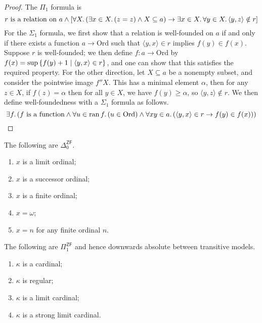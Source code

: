 \begin{proof}
    The \( \Pi_1 \) formula is
    \[ r \text{ is a relation on } a \wedge \qty[\forall X.\,(\exists x \in X.\, (z = z) \wedge X \subseteq a) \to \exists x \in X.\, \forall y \in X.\, \langle y, z \rangle \notin r] \]
    For the \( \Sigma_1 \) formula, we first show that a relation is well-founded on \( a \) if and only if there exists a function \( a \to \mathrm{Ord} \) such that \( \langle y, x \rangle \in r \) implies \( f(y) \in f(x) \).
    Suppose \( r \) is well-founded; we then define \( f : a \to \mathrm{Ord} \) by \( f(x) = \sup\qty{f(y) + 1 \mid \langle y, x \rangle \in r} \), and one can show that this satisfies the required property.
    For the other direction, let \( X \subseteq a \) be a nonempty subset, and consider the pointwise image \( f''X \).
    This has a minimal element \( \alpha \), then for any \( z \in X \), if \( f(z) = \alpha \) then for all \( y \in X \), we have \( f(y) \geq \alpha \), so \( \langle y, z \rangle \notin r \).
    We then define well-foundedness with a \( \Sigma_1 \) formula as follows.
    \[ \exists f.\, \qty(f \text{ is a function} \wedge \forall u \in \operatorname{ran} f.\, (u \in \mathrm{Ord}) \wedge \forall x y \in a.\, (\langle y, x \rangle \in r \to f(y) \in f(x))) \]
\end{proof}
\begin{proposition}
    The following are \( \Delta_0^{\mathsf{ZF}} \).
    \begin{enumerate}
        \item \( x \) is a limit ordinal;
        \item \( x \) is a successor ordinal;
        \item \( x \) is a finite ordinal;
        \item \( x = \omega \);
        \item \( x = n \) for any finite ordinal \( n \).
    \end{enumerate}
\end{proposition}
\begin{proposition}
    The following are \( \Pi_1^{\mathsf{ZF}} \) and hence downwards absolute between transitive models.
    \begin{enumerate}
        \item \( \kappa \) is a cardinal;
        \item \( \kappa \) is regular;
        \item \( \kappa \) is a limit cardinal;
        \item \( \kappa \) is a strong limit cardinal.
    \end{enumerate}
\end{proposition}
